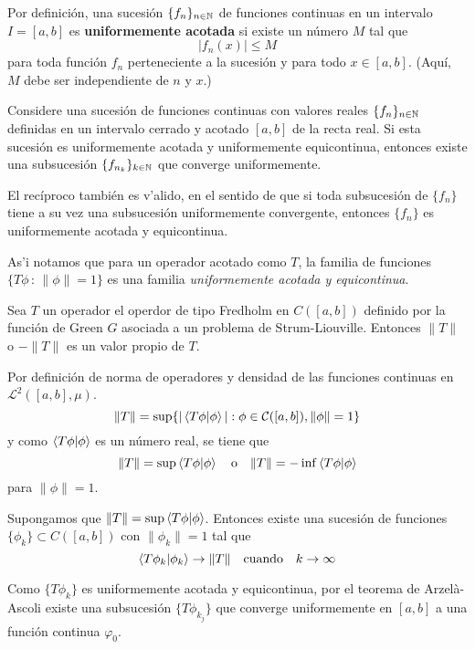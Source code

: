 \documentclass[main.tex]{subfiles}
\begin{document}
\begin{def.}
Por definición, una sucesión $\{f_n\}_{n\in \mathbb N }$ de funciones continuas en un intervalo $I = [a, b]$ es \textbf{uniformemente acotada} si existe un número $M$ tal que
\[
|f_n(x)| \leq M
\]
para toda función $f_n$ perteneciente a la sucesión y para todo $x \in [a, b]$. (Aquí, $M$ debe ser independiente de $n$ y $x$.)
\end{def.}

\begin{teorema}
Considere una sucesión de funciones continuas con valores reales $\{f_n\}_{n\in \mathbb N }$ definidas en un intervalo cerrado y acotado $[a, b]$ de la recta real. Si esta sucesión es uniformemente acotada y uniformemente equicontinua, entonces existe una subsucesión $\{f_{n_k}\}_{k\in \mathbb N }$ que converge uniformemente.

\noindent El recíproco también es v'alido, en el sentido de que si toda subsucesión de $\{f_n\}$ tiene a su vez una subsucesión uniformemente convergente, entonces $\{f_n\}$ es uniformemente acotada y equicontinua.
\end{teorema}
\noindent As'i notamos que para un operador acotado como $T$, la familia de funciones $\{T\phi\,:\,\|\phi\|=1\}$ es una familia \emph{uniformemente acotada y equicontinua}.
\begin{lema}\label{norm-eigen}
 Sea $T$ un operador el operdor de tipo Fredholm en $C([a,b])$ definido por la función de Green $G$ asociada a un problema de Strum-Liouville. Entonces $\|T\|$ o $-\|T\|$ es un valor propio de $T$.
\end{lema}
\dem Por definición de norma de operadores y densidad de las funciones continuas en $\mathcal{L}^{2}([a,b],\mu)$.
\[
\|T\| = \sup\{|\braket{T\phi | \phi}| : \phi \in \mathcal{C}([a,b]), \|\phi\| = 1\}
\]
y como $\braket{ T\phi |\phi}$ es un número real, se tiene que
\[
\|T\| = \sup \braket{T\phi|\phi} \quad \text{o} \quad \|T\| = -\inf \braket{ T\phi|\phi}
\]
para $\|\phi\| = 1$.

Supongamos que $\|T\| = \sup \braket{T\phi|\phi}$. Entonces existe una sucesión de funciones $\{\phi_k\} \subset C([a,b])$ con $\|\phi_k\| = 1$ tal que
\[
\braket{ T\phi_k| \phi_k } \to \|T\| \quad \text{cuando} \quad k \to \infty
\]

Como $\{T\phi_k\}$ es uniformemente acotada y equicontinua, por el teorema de Arzelà-Ascoli existe una subsucesión $\{T\phi_{k_j}\}$ que converge uniformemente en $[a,b]$ a una función continua $\varphi_0$.
\end{document}
